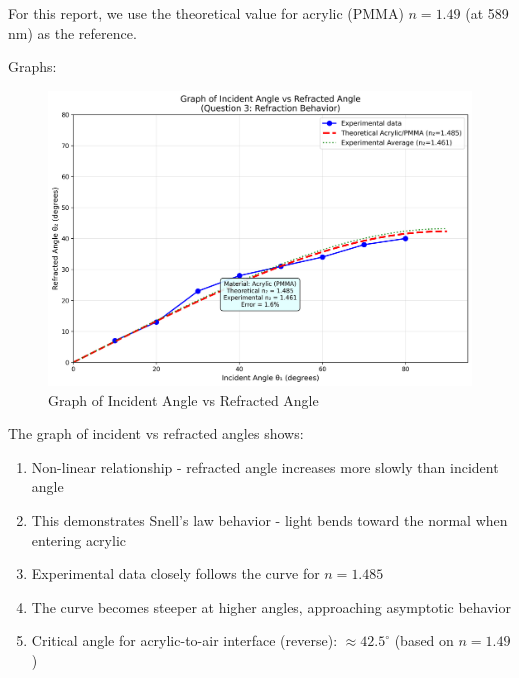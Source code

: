 \documentclass[12pt, a4paper]{article}
\begin{document}
For this report, we use the theoretical value for acrylic (PMMA) $n = 1.49$ (at 589 nm) as the reference.

Graphs:

\begin{figure}[H]
\centering
\includegraphics[width=\textwidth]{graphs/incident_vs_refracted_angle.png}
\caption{Graph of Incident Angle vs Refracted Angle}
\label{fig:incident_vs_refracted}
\end{figure}

The graph of incident vs refracted angles shows:
\begin{enumerate}
\item Non-linear relationship - refracted angle increases more slowly than incident angle
\item This demonstrates Snell's law behavior - light bends toward the normal when entering acrylic
\item Experimental data closely follows the curve for $n=1.485$
\item The curve becomes steeper at higher angles, approaching asymptotic behavior
\item Critical angle for acrylic-to-air interface (reverse): $\approx 42.5^\circ$ (based on $n=1.49$)
\end{enumerate}
\end{document}
